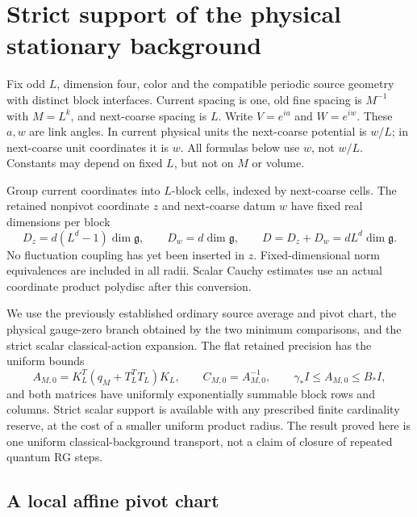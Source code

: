 \section{Strict support of the physical stationary background}
\label{st-section}

Fix odd $L$, dimension four, color and the compatible periodic source
geometry with distinct block interfaces. Current spacing is one, old
fine spacing is $M^{-1}$ with $M=L^k$, and next-coarse spacing is $L$.
Write $V=e^{ia}$ and $W=e^{iw}$. These $a,w$ are link angles. In current
physical units the next-coarse potential is $w/L$; in next-coarse unit
coordinates it is $w$. All formulas below use $w$, not $w/L$.
Constants may depend on fixed $L$, but not on $M$ or volume.

Group current coordinates into $L$-block cells, indexed by next-coarse
cells. The retained nonpivot coordinate $z$ and next-coarse datum $w$
have fixed real dimensions per block
\begin{equation}
 D_z=d(L^d-1)\dim\mathfrak g,\qquad D_w=d\dim\mathfrak g,
 \qquad D=D_z+D_w=dL^d\dim\mathfrak g.                         \label{st-dimensions}
\end{equation}
No fluctuation coupling has yet been inserted in $z$. Fixed-dimensional
norm equivalences are included in all radii. Scalar Cauchy estimates use
an actual coordinate product polydisc after this conversion.

We use the previously established ordinary source average and pivot
chart, the physical gauge-zero branch obtained by the two minimum
comparisons, and the strict scalar classical-action expansion. The flat
retained precision has the uniform bounds
\begin{equation}
 A_{M,0}=K_L^T(q_M+T_L^TT_L)K_L,\qquad C_{M,0}=A_{M,0}^{-1},
 \qquad \gamma_*I\le A_{M,0}\le B_*I,                         \label{st-flat-precision}
\end{equation}
and both matrices have uniformly exponentially summable block rows and
columns. Strict scalar support is available with any prescribed finite
cardinality reserve, at the cost of a smaller uniform product radius.
The result proved here is one uniform classical-background transport,
not a claim of closure of repeated quantum RG steps.

\subsection{A local affine pivot chart}
\label{st-affine-section}

